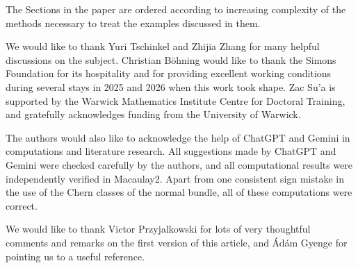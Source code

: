 \documentclass[11pt]{amsart}
\theoremstyle{plain}
\numberwithin{equation}{section}
\theoremstyle{definition}
\theoremstyle{remark}
\begin{document}
The Sections in the paper are ordered according to increasing complexity of the methods necessary to treat the examples discussed in them. 

\medskip

We would like to thank Yuri Tschinkel and Zhijia Zhang for many helpful discussions on the subject. Christian B\"ohning would like to thank the Simons Foundation for its hospitality and for providing excellent working conditions during several stays in 2025 and 2026 when this work took shape. Zac Su'a is supported by the Warwick Mathematics Institute Centre for Doctoral Training, and gratefully acknowledges funding from the University of Warwick.

The authors would also like to acknowledge the help of ChatGPT and Gemini in computations and literature research. All suggestions made by ChatGPT and Gemini were checked carefully by the
authors, and all computational results were independently verified in
Macaulay2. Apart from one consistent
sign mistake in the use of the Chern classes of the normal bundle, all of
these computations were correct.

We would like to thank Victor Przyjalkowski for lots of very thoughtful comments and remarks on the first version of this article, and \'{A}d\'{a}m Gyenge for pointing us to a useful reference. 


\end{document}
